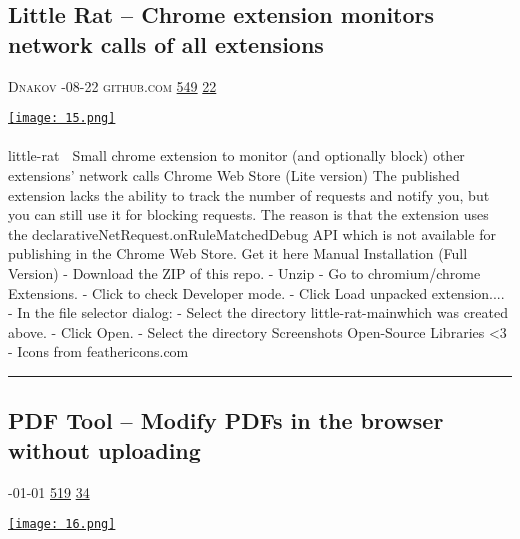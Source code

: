 \documentclass[10pt,a4paper]{article}
\begin{document}
\begin{multicols*}{2}
\begin{minipage}{\linewidth}
\subsection{Little Rat – Chrome extension monitors network calls of all extensions}
\textsc{\footnotesize
{\scriptsize\faUser}\space 
Dnakov 
{\scriptsize\faCalendar}-08-22 
{\scriptsize\faGithub}\space 
github.com 
{\scriptsize\faThumbsOUp}\space 
\href{http://news.ycombinator.com/item?id=37119942\&utm\_term=comment}{549} 
{\scriptsize\faComments}\space 
\href{http://news.ycombinator.com/item?id=37119942\&utm\_term=comment}{22} 
}
\par\medskip\noindent
\href{https://github.com/dnakov/little-rat?utm\_source=hackernewsletter\&utm\_medium=email\&utm\_term=show\_hn}{
    \texttt{[image: 15.png]}
}
\end{minipage}
\paragraph{}
little-rat
🐀 Small chrome extension to monitor (and optionally block) other extensions' network calls
Chrome Web Store (Lite version)
The published extension lacks the ability to track the number of requests and notify you, but you can still use it for blocking requests. The reason is that the extension uses the
declarativeNetRequest.onRuleMatchedDebug API which is not available for publishing in the Chrome Web Store.
Get it here
Manual Installation (Full Version)
- Download the ZIP of this repo.
- Unzip
- Go to chromium/chrome Extensions.
- Click to check Developer mode.
- Click Load unpacked extension....
- In the file selector dialog:
- Select the directory
little-rat-mainwhich was created above.
- Click Open.
- Select the directory
Screenshots
Open-Source Libraries <3
- Icons from feathericons.com
\par\noindent\textcolor{red}{\rule{\linewidth}{0.2mm}}
\vfill
\null
\noindent\begin{minipage}{\linewidth}
\subsection{PDF Tool – Modify PDFs in the browser without uploading}
\textsc{\footnotesize
{\scriptsize\faCalendar}-01-01 
{\scriptsize\faThumbsOUp}\space 
\href{http://news.ycombinator.com/item?id=37110628\&utm\_term=comment}{519} 
{\scriptsize\faComments}\space 
\href{http://news.ycombinator.com/item?id=37110628\&utm\_term=comment}{34} 
}
\par\medskip\noindent
\href{https://www.pdftool.org?utm\_source=hackernewsletter\&utm\_medium=email\&utm\_term=show\_hn}{
    \texttt{[image: 16.png]}
}
\end{minipage}

\end{multicols*}
\end{document}
